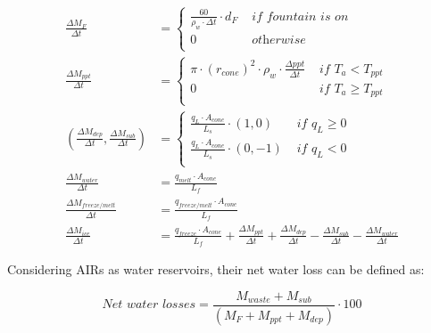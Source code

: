 \begin{subequations}
	\begin{align}
		\frac{\Delta M_{F}}{\Delta t} & = \left\{ \begin{array}{ll} \frac{60}{\rho_w \cdot \Delta t} \cdot d_F
			 & \textit{ if fountain is on} \\ 0 & \textit{ otherwise } \\\end{array} \right.                                             \\
		\label{eq:ppt}
		\frac{\Delta M_{ppt}}{\Delta t}                                    & = \left\{ \begin{array}{ll} \pi \cdot
        {(r_{cone})}^2 \cdot
			\rho_{w}\cdot \frac {\Delta ppt}{\Delta t} & \textit{ if } T_{a} < T_{ppt} \\ 0 & \textit{ if } T_{a} \geq T_{ppt} \\\end{array} \right.                                             \\
		\label{eq:vap}
		(\frac{\Delta M_{dep}}{\Delta t}, \frac{\Delta M_{sub}}{\Delta t}) & = \left\{ \begin{array}{ll} \frac{q_{L}
			\cdot A_{cone}}{L_s}\cdot (1,0)  & \textit{ if } q_{L} \geq 0 \\ \frac{q_{L}
			\cdot A_{cone}}{L_s}\cdot (0,-1) & \textit{ if } q_{L} < 0    \\\end{array} \right.                                             \\
		\label{eq:mwat}
		\frac{\Delta M_{water}}{\Delta t}                                  & = \frac{q_{melt} \cdot A_{cone} }{L_f}                                                   \\
	  \label{eq:m_freeze/melt}
    \frac{\Delta M_{freeze/melt}}{\Delta t} & = \frac{q_{freeze/melt} \cdot A_{cone} }{L_f} \\
		\label{eq:mcone}
		\frac{\Delta M_{ice}}{\Delta t}                                    & = \frac{q_{freeze}\cdot A_{cone} }{L_f} + \frac{\Delta M_{ppt}}{\Delta t} + \frac{\Delta
			M_{dep}}{\Delta t}- \frac{\Delta M_{sub}}{\Delta t}- \frac{\Delta M_{water}}{\Delta t}
	\end{align}
\end{subequations}

Considering AIRs as water reservoirs, their net water loss can be defined as:

\begin{equation} \textit{Net water losses} = \frac{M_{waste}+M_{sub}}{(M_F+M_{ppt}+M_{dep})} \cdot 100 \end{equation}


